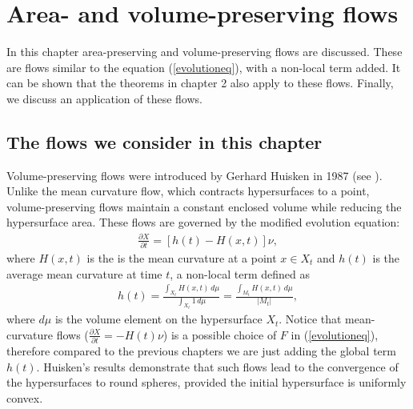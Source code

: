\chapter{Area- and volume-preserving flows}


In this chapter area-preserving and volume-preserving flows are discussed. These are flows similar to the equation (\ref{evolutioneq}), with a non-local term added. It can be shown that the theorems in chapter 2 also apply to these flows. Finally, we discuss an application of these flows. 
\section{The flows we consider in this chapter}\label{Area- and volume-preserving flows}
Volume-preserving flows were introduced by Gerhard Huisken in 1987 (see \cite{volpres}). Unlike the mean curvature flow, which contracts hypersurfaces to a point, volume-preserving flows maintain a constant enclosed volume while reducing the hypersurface area. These flows are governed by the modified evolution equation:
\begin{align*}
	\frac{\partial X}{\partial t} = \left[h(t) - H(x, t)\right]\nu,
\end{align*}
where $ H(x, t)$ is the is the mean curvature at a point $x\in X_t$ and $h(t)$ is the average mean curvature at time $t$, a non-local term defined as 
\begin{align*}
	h(t) = \frac{\int_{X_t} H(x, t) \, d\mu}{\int_{X_t} 1 \, d\mu}= \frac{\int_{M_t} H(x, t) \, d\mu}{|M_t|},
\end{align*}
where $d\mu$ is the volume element on the hypersurface \( X_t \).
Notice that mean-curvature flows ($\frac{\partial X}{\partial t} = - H(t)\nu$) is a possible choice of $F$ in (\ref{evolutioneq}), therefore compared to the previous chapters we are just adding the global term $h(t)$. Huisken's results demonstrate that such flows lead to the convergence of the hypersurfaces to round spheres, provided the initial hypersurface is uniformly convex. 

